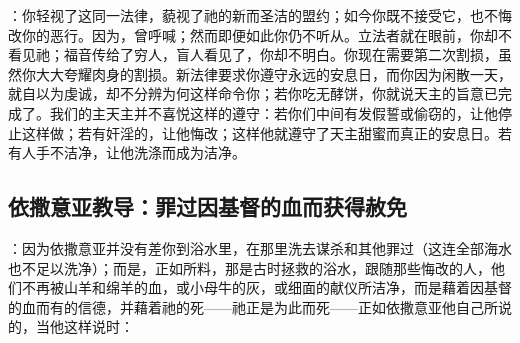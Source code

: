 ：你轻视了这同一法律，藐视了祂的新而圣洁的盟约；如今你既不接受它，也不悔改你的恶行。因为，曾呼喊；然而即便如此你仍不听从。立法者就在眼前，你却不看见祂；福音传给了穷人，盲人看见了，你却不明白。你现在需要第二次割损，虽然你大大夸耀肉身的割损。新法律要求你遵守永远的安息日，而你因为闲散一天，就自以为虔诚，却不分辨为何这样命令你；若你吃无酵饼，你就说天主的旨意已完成了。我们的主天主并不喜悦这样的遵守：若你们中间有发假誓或偷窃的，让他停止这样做；若有奸淫的，让他悔改；这样他就遵守了天主甜蜜而真正的安息日。若有人手不洁净，让他洗涤而成为洁净。\par


\subsection{依撒意亚教导：罪过因基督的血而获得赦免}

：因为依撒意亚并没有差你到浴水里，在那里洗去谋杀和其他罪过（这连全部海水也不足以洗净）；而是，正如所料，那是古时拯救的浴水，跟随那些悔改的人，他们不再被山羊和绵羊的血，或小母牛的灰，或细面的献仪所洁净，而是藉着因基督的血而有的信德，并藉着祂的死——祂正是为此而死——正如依撒意亚他自己所说的，当他这样说时：\par

